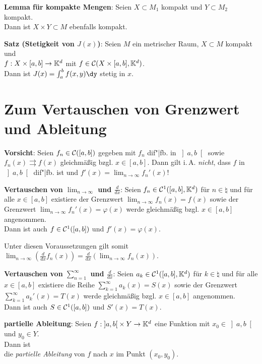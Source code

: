 \textbf{Lemma für kompakte Mengen}:
Seien $X \subset M_1$ kompakt und $Y \subset M_2$ kompakt. \\
Dann ist $X \times Y \subset M$ ebenfalls kompakt.

\linie

\textbf{Satz (Stetigkeit von $J(x)$)}:
Seien $M$ ein metrischer Raum, $X \subset M$ kompakt und \\
$f: X \times [a,b] \rightarrow \mathbb{K}^d$ mit
$f \in \mathcal{C}(X \times [a,b], \mathbb{K}^d)$. \\
Dann ist $J(x) = \int_a^b f(x, y)\dy$ stetig in $x$.

\pagebreak

\section{%
    Zum Vertauschen von Grenzwert und Ableitung%
}


\textbf{Vorsicht}:
Seien $f_n \in \mathcal{C}([a,b])$ gegeben mit $f_n$ dif"|fb. in $\left]a,b\right[$
sowie $f_n(x) \rightrightarrows f(x)$ gleichmäßig bzgl. $x \in [a,b]$.
Dann gilt i.\,A. \emph{nicht}, dass $f$ in $\left]a,b\right[$ dif"|fb. ist
und $f'(x) = \lim_{n \to \infty} f_n'(x)$!

\textbf{Vertauschen von $\lim_{n \to \infty}$ und $\frac{d}{dx}$}:
Seien $f_n \in \mathcal{C}^1([a,b], \mathbb{K}^d)$ für $n \in \natural$
und für alle $x \in [a,b]$ existiere der Grenzwert
$\lim_{n \to \infty} f_n(x) = f(x)$ sowie der Grenzwert
$\lim_{n \to \infty} f_n'(x) = \varphi(x)$ werde gleichmäßig bzgl.
$x \in [a,b]$ angenommen. \\
Dann ist auch $f \in \mathcal{C}^1([a,b])$ und $f'(x) = \varphi(x)$.

Unter diesen Voraussetzungen gilt somit
$\lim_{n \to \infty} \left(\frac{d}{dx} f_n(x)\right) =
\frac{d}{dx} \left(\lim_{n \to \infty} f_n(x)\right)$.

\textbf{Vertauschen von $\sum_{n=1}^\infty$ und $\frac{d}{dx}$}:
Seien $a_k \in \mathcal{C}^1([a,b], \mathbb{K}^d)$ für $k \in \natural$ und für alle \\
$x \in [a,b]$ existiere die Reihe
$\sum_{k=1}^\infty a_k(x) = S(x)$ sowie der Grenzwert
$\sum_{k=1}^\infty a_k'(x) = T(x)$ werde gleichmäßig bzgl.
$x \in [a,b]$ angenommen. \\
Dann ist auch $S \in \mathcal{C}^1([a,b])$ und $S'(x) = T(x)$.

\linie

\textbf{partielle Ableitung}:
Seien $f: \left]a,b\right[ \times Y \rightarrow \mathbb{K}^d$ eine Funktion
mit $x_0 \in \left]a,b\right[$ und $y_0 \in Y$. \\
Dann ist
 \\
die \emph{partielle Ableitung} von $f$ nach $x$ im Punkt $(x_0, y_0)$.

